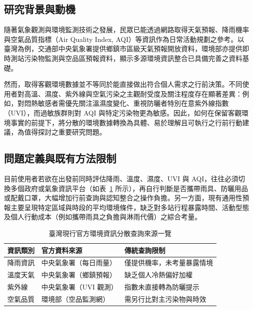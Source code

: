 \documentclass[conference]{IEEEtran}
\begin{document}
\subsection{研究背景與動機}
隨著氣象觀測與環境監測技術之發展，民眾已能透過網路取得天氣預報、降雨機率與空氣品質指標（Air Quality Index, AQI）等資訊作為日常活動規劃之參考。以臺灣為例，交通部中央氣象署提供鄉鎮市區級天氣預報開放資料，環境部亦提供即時測站污染物監測與空品區預報資料，顯示多源環境資訊整合已具備完善之資料基礎。

然而，取得客觀環境數據並不等同於能直接做出符合個人需求之行前決策。不同使用者對高溫、濕度、紫外線與空氣污染之主觀耐受度及關注程度存在顯著差異：例如，對悶熱敏感者需優先關注溫濕度變化、重視防曬者特別在意紫外線指數（UVI），而過敏族群則對 AQI 與特定污染物更為敏感。因此，如何在保留客觀環境事實的前提下，將分散的環境數據轉換為具體、易於理解且可執行之行前行動建議，為值得探討之重要研究問題。

\subsection{問題定義與既有方法限制}
目前使用者若欲在出發前同時評估降雨、溫度、濕度、UVI 與 AQI，往往必須切換多個政府或氣象資訊平台（如表~\ref{tab:fragmented_sources} 所示），再自行判斷是否攜帶雨具、防曬用品或配戴口罩，大幅增加行前查詢與認知整合之操作負擔。另一方面，現有通用性預報主要呈現特定區域與時段的平均環境條件，缺乏對多站行程暴露時間、活動型態及個人行動成本（例如攜帶雨具之負擔與淋雨代價）之綜合考量。

\begin{table}[t]
  \centering
  \caption{臺灣現行官方環境資訊分散查詢來源一覽}
  \label{tab:fragmented_sources}
  \begin{tabularx}{\columnwidth}{@{}l l X@{}}
    \toprule
    \textbf{資訊類別} & \textbf{官方資料來源} & \textbf{傳統查詢限制} \\
    \midrule
    降雨資訊 & 中央氣象署（每日雨量） & 僅提供機率，未考量暴露情境 \\
    溫度天氣 & 中央氣象署（鄉鎮預報） & 缺乏個人冷熱偏好加權 \\
    紫外線 & 中央氣象署（UVI 觀測） & 指數未直接轉為防曬提示 \\
    空氣品質 & 環境部（空品監測網） & 需另行比對主污染物與時效 \\
    \bottomrule
  \end{tabularx}
\end{table}
\end{document}
